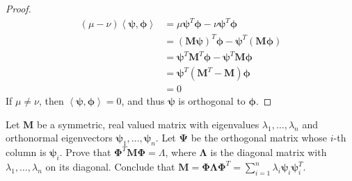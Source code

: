 \documentclass[11pt,letterpaper]{article}
\begin{document}
\begin{proof}
    \begin{align*}
      (\mu - \nu)\left\langle \bm{\psi}, \bm{\phi} \right\rangle
      &= \mu \bm{\psi}^T \bm{\phi} - \nu \bm{\psi}^T \bm{\phi}\\
      &= (\bm{M}\bm{\psi})^T \bm{\phi} - \bm{\psi}^T (\bm{M}\bm{\phi})\\
      &= \bm{\psi}^T \bm{M}^T \bm{\phi} - \bm{\psi}^T \bm{M}\bm{\phi}\\
      &= \bm{\psi}^T (\bm{M}^T -  \bm{M}) \bm{\phi}\\
      &= 0
    \end{align*}
    If $\mu \neq \nu$, then $\left\langle \bm{\psi}, \bm{\phi} \right\rangle = 0$,
    and thus $\bm{\psi}$ is orthogonal to $\bm{\phi}$.
\end{proof}

\begin{exercise}
  Let $\bm{M}$ be a symmetric, real valued matrix with eigenvalues $\lambda_1,\ldots,\lambda_n$ and
  orthonormal eigenvectors $\bm{\psi}_1,\ldots,\bm{\psi}_n$.
  Let $\bm{\Psi}$ be the orthogonal matrix whose $i$-th column is $\bm{\psi}_i$.
  Prove that $\bm{\Phi}^T \bm{M} \bm{\Phi} = \Lambda$,
  where $\bm{\Lambda}$ is the diagonal matrix with $\lambda_1,\ldots,\lambda_n$ on its diagonal.
  Conclude that $\bm{M}=\bm{\Phi} \bm{\Lambda} \bm{\Phi}^T = \sum_{i=1}^n \lambda_i \bm{\psi}_i\bm{\psi}_i^T$.
\end{exercise}
\end{document}
